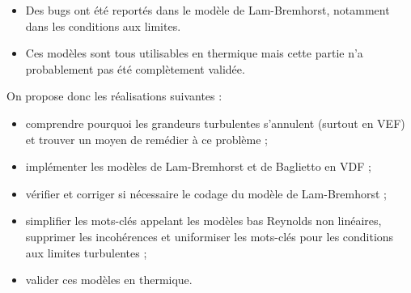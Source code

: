 \begin{itemize}
L'activation de la relation de fermeture lin\'eaire ou non lin\'eaire du tenseur de Reynolds se fait avec le mot-cl\'e \texttt{Reynolds\_stress\_isotrope 0|1}, qui n'est cependant pas requis (le code ne renvoie pas d'erreur si ce mot-cl\'e n'est pas sp\'ecifi\'e) et dont l'effet n'est pas toujours \'evident pour l'utilisateur. Par exemple, dans les mots-cl\'es suivants : \texttt{Launder\_Sharma \{ Reynolds\_stress\_isotrope 0 \}}, il est difficile de savoir si l'on utilise le mod\`ele non lin\'eaire (donc de Baglietto) avec la correction bas Reynolds de Launder-Sharma, ou si \texttt{Reynolds\_stress\_isotrope 0} n'a pas d'effet. Autre exemple, est-ce que \texttt{standard\_keps \{ Reynolds\_stress\_isotrope 1 \}} signifie que l'on utilise le mod\`ele $k$--$\varepsilon$ standard ? De plus, il existe une confusion sur le mot-cl\'e \`a sp\'ecifier pour d\'efinir les conditions aux limites turbulentes aux parois : est-ce \texttt{paroi} ou \texttt{paroi\_fixe}, et quelle est la diff\'erence entre les deux ? Enfin, selon que le mod\`ele est {\og bas Reynolds \fg} ou non, il faut sp\'ecifier l'activation ou non de la loi de paroi, ce qui ajoute \`a la complexit\'e. Par exemple en bas Reynolds, il faut la d\'esactiver en utilisant le mot-cl\'e \texttt{turbulence\_paroi negligeable}.\medskip

	\item Des bugs ont \'et\'e report\'es dans le mod\`ele de Lam-Bremhorst, notamment dans les conditions aux limites.\medskip

	\item Ces mod\`eles sont tous utilisables en thermique mais cette partie n'a probablement pas \'et\'e compl\`etement valid\'ee.\medskip
\end{itemize}

On propose donc les r\'ealisations suivantes :\medskip

\begin{itemize}
	\item comprendre pourquoi les grandeurs turbulentes s'annulent (surtout en VEF) et trouver un moyen de rem\'edier \`a ce probl\`eme ;
	\item impl\'ementer les mod\`eles de Lam-Bremhorst et de Baglietto en VDF ;
	\item v\'erifier et corriger si n\'ecessaire le codage du mod\`ele de Lam-Bremhorst ;
	\item simplifier les mots-cl\'es appelant les mod\`eles bas Reynolds non lin\'eaires, supprimer les incoh\'erences et uniformiser les mots-cl\'es pour les conditions aux limites turbulentes ;
	\item valider ces mod\`eles en thermique.\medskip
\end{itemize}

